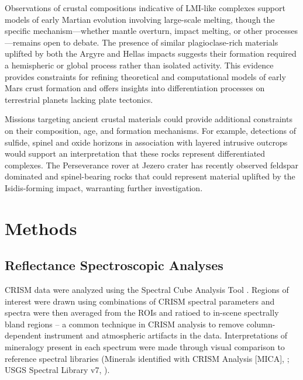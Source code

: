 \documentclass[11pt]{article}
\begin{document}
Observations of crustal compositions indicative of LMI-like complexes support models of early Martian evolution involving large-scale melting, though the specific mechanism---whether mantle overturn, impact melting, or other processes---remains open to debate. The presence of similar plagioclase-rich materials uplifted by both the Argyre and Hellas impacts suggests their formation required a hemispheric or global process rather than isolated activity. This evidence provides constraints for refining theoretical and computational models of early Mars crust formation and offers insights into differentiation processes on terrestrial planets lacking plate tectonics.

Missions targeting ancient crustal materials could provide additional constraints on their composition, age, and formation mechanisms. For example, detections of sulfide, spinel and oxide horizons in association with layered intrusive outcrops would support an interpretation that these rocks represent differentiated complexes. The Perseverance rover at Jezero crater has recently observed feldspar dominated \citep{Bedford2024, Schmidt2025} and spinel-bearing rocks \citep{Mansbach2024, Bedford2024, Lawson2025} that could represent material uplifted by the Isidis-forming impact, warranting further investigation.

\section*{Methods}

\subsection*{Reflectance Spectroscopic Analyses}

CRISM data were analyzed using the Spectral Cube Analysis Tool \citep{Phillips2024}. Regions of interest were drawn using combinations of CRISM spectral parameters \citep{Viviano2014} and spectra were then averaged from the ROIs and ratioed to in-scene spectrally bland regions -- a common technique in CRISM analysis to remove column-dependent instrument and atmospheric artifacts in the data. Interpretations of mineralogy present in each spectrum were made through visual comparison to reference spectral libraries (Minerals identified with CRISM Analysis [MICA], \citealt{Viviano2014}; USGS Spectral Library v7, \citealt{Kokaly2017}).
\end{document}

